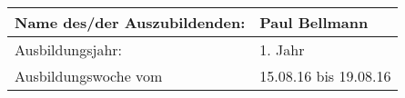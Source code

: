 \begin{center}
	\begin{tabular}{ | m{15em} | m{21em} | }
	\hline
	Name des/der Auszubildenden: & Paul Bellmann \\ \hline
	Ausbildungsjahr: & 1. Jahr \\ \hline
	Ausbildungswoche vom & 15.08.16 bis 19.08.16 \\ \hline
	\end{tabular}
\end{center}